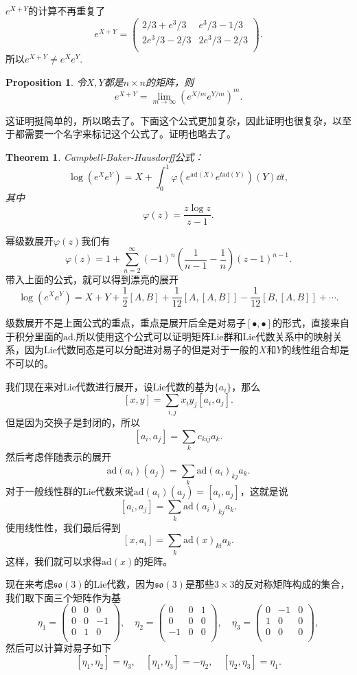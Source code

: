 \documentclass[8pt]{book}
\theoremstyle{plain}
\newtheorem{pro}[defi]{Proposition}
\newtheorem{theo}[defi]{Theorem}
\newcommand{\ad}{{\mathrm{ad}}}
\begin{document}
$e^{X+Y}$的计算不再重复了
\[
e^{X+Y}=\begin{pmatrix}
 2/3+e^3/3 & e^3/3-1/3 \\
 2 e^3/3-2/3 & 2 e^3/3-2/3 \\
\end{pmatrix}.
\]
所以$e^{X+Y}\neq e^Xe^Y$.
\begin{pro}
令$X,Y$都是$n\times n$的矩阵，则
\[
	e^{X+Y}=\lim_{m\to\infty}\left(e^{X/m}e^{Y/m}\right)^m.
\]
\end{pro}
这证明挺简单的，所以略去了。下面这个公式更加复杂，因此证明也很复杂，以至于都需要一个名字来标记这个公式了。证明也略去了。
\begin{theo}
Campbell-Baker-Hausdorff公式：
\[
\log\left(e^Xe^Y\right)=X+\int_0^1 \varphi\left(e^{\ad(X)}e^{t\ad(Y)}\right)(Y)\dd t,
\]
其中
\[
\varphi(z)=\frac{z\log z}{z-1}.
\]
\end{theo}
幂级数展开$\varphi(z)$我们有
\[
	\varphi(z)=1+\sum_{n=2}^\infty (-1)^n\left(\frac{1}{n-1}-\frac{1}{n}\right)(z-1)^{n-1}.
\]
带入上面的公式，就可以得到漂亮的展开
\[
\log\left(e^Xe^Y\right)=X+Y+\frac{1}{2}[A,B]+\frac{1}{12}[A,[A,B]]-\frac{1}{12}[B,[A,B]]+\cdots.
\]

级数展开不是上面公式的重点，重点是展开后全是对易子$[\bullet,\bullet]$的形式，直接来自于积分里面的$\ad$.所以使用这个公式可以证明矩阵Lie群和Lie代数关系中的映射关系，因为Lie代数同态是可以分配进对易子的但是对于一般的$X$和$Y$的线性组合却是不可以的。

我们现在来对Lie代数进行展开，设Lie代数的基为$\{a_i\}$，那么
\[
[x,y]=\sum_{i,j}x_iy_j[a_i,a_j].
\]
但是因为交换子是封闭的，所以
\[
	[a_i,a_j]=\sum_k c_{kij}a_k.
\]
然后考虑伴随表示的展开
\[
	\ad(a_i)(a_j)=\sum_k \ad(a_i)_{kj}a_k.
\]
对于一般线性群的Lie代数来说$\ad(a_i)(a_j)=[a_i,a_j]$，这就是说
\[
	[a_i,a_j]=\sum_k \ad(a_i)_{kj}a_k.
\]
使用线性性，我们最后得到
\[
	[x,a_i]=\sum_k \ad(x)_{ki}a_k.
\]
这样，我们就可以求得$\ad(x)$的矩阵。

现在来考虑$\mathfrak{so}(3)$的Lie代数，因为$\mathfrak{so}(3)$是那些$3\times 3$的反对称矩阵构成的集合，我们取下面三个矩阵作为基
\[
	\eta_1=
		\begin{pmatrix}
			0&0&0\\
			0&0&-1\\
			0&1&0\\
		\end{pmatrix},\quad
	\eta_2=
		\begin{pmatrix}
			0&0&1\\
			0&0&0\\
			-1&0&0\\
		\end{pmatrix},\quad
	\eta_3=
		\begin{pmatrix}
			0&-1&0\\
			1&0&0\\
			0&0&0\\
		\end{pmatrix},
\]
然后可以计算对易子如下
\[
	[\eta_1,\eta_2]=\eta_3,\quad [\eta_1,\eta_3]=-\eta_2,\quad [\eta_2,\eta_3]=\eta_1.
\]
\end{document}
